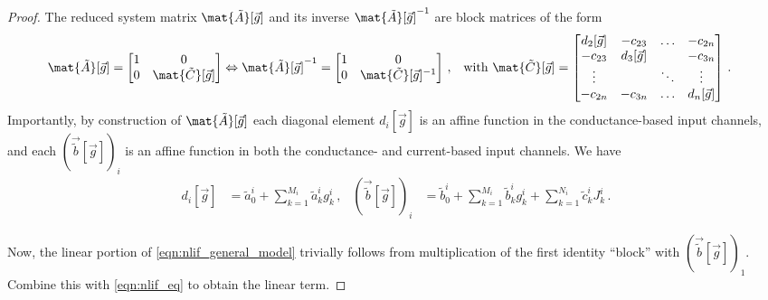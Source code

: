 \begin{proof}
The reduced system matrix $\mat{\tilde A}[\vec g]$ and its inverse $\mat{\tilde A}[\vec g]^{-1}$ are block matrices of the form
\begin{align}
	\mat{\tilde A}[\vec g] &= \begin{bmatrix}
		1 & 0 \\
		0 & {\mat{\tilde C}}[\vec g]
	\end{bmatrix} \Leftrightarrow
	\mat{\tilde A}[\vec g]^{-1} = \begin{bmatrix}
		1 & 0 \\
		0 & {\mat{\tilde C}}[\vec g]^{-1}
	\end{bmatrix} \,,
	&\text{with }
	\mat{\tilde C}[\vec g] &= \begin{bmatrix}
	   d_2[\vec g] & -c_{23} & \ldots & -c_{2n} \\
	-c_{23} & d_3[\vec g] &  & -c_{3n} \\
	\vdots & & \ddots & \vdots \\
	-c_{2n} & -c_{3n} & \ldots & d_n[\vec g]
	\end{bmatrix} \,.
	\label{eqn:nlif_matrix_blocks}
\end{align}
Importantly, by construction of $\mat{\tilde A}[\vec g]$ each diagonal element $d_i[\vec g]$ is an affine function in the conductance-based input channels, and each $(\vec{\tilde b}[\vec g])_i$ is an affine function in both the conductance- and current-based input channels. We have
\begin{align*}
	d_i[\vec g] &= \tilde a_0^i + \sum_{k = 1}^{M_i} \tilde a_k^i g_k^i \,, & 
	(\vec{\tilde b}[\vec g])_i &= \tilde b_0^i + \sum_{k = 1}^{M_i} \tilde b_k^i g_k^i + \sum_{k = 1}^{N_i} \tilde c_k^i J_k^i \,.
\end{align*}

Now, the linear portion of \cref{eqn:nlif_general_model} trivially follows from multiplication of the first identity \enquote{block} with $(\vec{\tilde b}[\vec g])_1$.
Combine this with \cref{eqn:nlif_eq} to obtain the linear term.


\end{proof}
